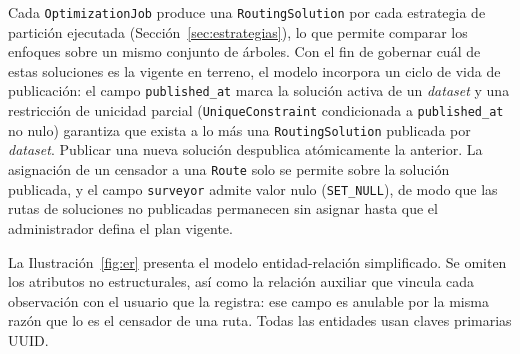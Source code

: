 Cada \texttt{OptimizationJob} produce una \texttt{RoutingSolution} por cada estrategia
de partición ejecutada (Sección~\ref{sec:estrategias}), lo que permite comparar los
enfoques sobre un mismo conjunto de árboles. Con el fin de gobernar cuál de estas soluciones
es la vigente en terreno, el modelo incorpora un ciclo de vida de publicación: el
campo \texttt{published\_at} marca la solución activa de un \textit{dataset} y una
restricción de unicidad parcial (\texttt{UniqueConstraint} condicionada a
\texttt{published\_at} no nulo) garantiza que exista a lo más una
\texttt{RoutingSolution} publicada por \textit{dataset}. Publicar una nueva solución
despublica atómicamente la anterior. La asignación de un censador a una \texttt{Route}
solo se permite sobre la solución publicada, y el campo \texttt{surveyor} admite valor
nulo (\texttt{SET\_NULL}), de modo que las rutas de soluciones no publicadas permanecen
sin asignar hasta que el administrador defina el plan vigente.

La Ilustración~\ref{fig:er} presenta el modelo entidad-relación simplificado. Se omiten
los atributos no estructurales, así como la relación auxiliar que vincula cada
observación con el usuario que la registra: ese campo es anulable por la misma razón
que lo es el censador de una ruta. Todas las entidades usan claves primarias UUID.

